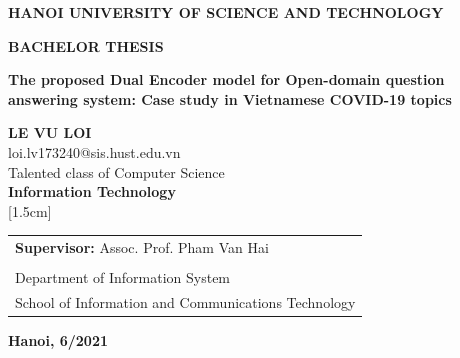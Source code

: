 \documentclass[12pt, sort&compress]{report}
\begin{document}
\captionsenglish
\dateUSenglish
\begin{titlepage}
	\begin{center}
		\vspace{1pt}
		{\textbf{\Large{HANOI UNIVERSITY OF SCIENCE AND TECHNOLOGY}}}\\[2cm]
		
	\end{center}
	\vspace{10pt}
	\begin{center}
		\vspace{8pt}
		\fontsize{34pt}{18pt}\selectfont 
		\textbf{\textrm{BACHELOR THESIS}} 
		\vspace{8pt}
	\end{center}
	\begin{center}
		\fontsize{21pt}{17pt}\selectfont 
		\textbf{\Large \textrm{The proposed Dual Encoder model for Open-domain question answering system: Case study in Vietnamese COVID-19 topics}} \\[1.5cm]
	\end{center}
	
	\begin{center}
		\fontsize{17pt}{17pt}\selectfont
		\textbf{\Large LE VU LOI}    \\
		loi.lv173240@sis.hust.edu.vn \\
		Talented class of Computer Science \\[0.5cm]
		\textbf{Information Technology} \\
		[1.5cm]
	\end{center}
	\vspace{1cm}
	\begin{table}[h!]
		\fontsize{14.5pt}{17pt}\selectfont
		\centering
		\begin{tabular}{ l} 
			\textbf{Supervisor:} Assoc. Prof. Pham Van Hai \hspace{0.6cm} \underline{\hspace{3.8cm}} \\ 
			\hspace{10cm}{\small Signature}\\
			Department of Information System \\[0.2cm]
			School of Information and Communications Technology \\ [5cm] 
		\end{tabular}
	\end{table} 
	
	\begin{center}
		\textbf{\large Hanoi, 6/2021}
	\end{center}
\end{titlepage}
\newpage
\end{document}
